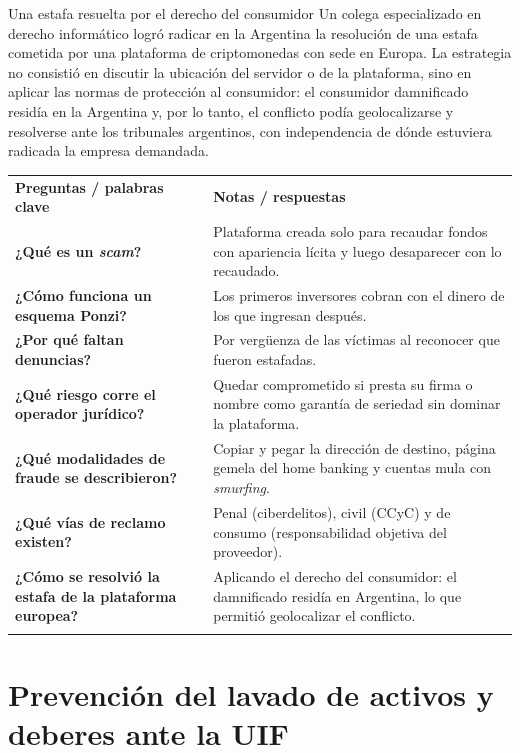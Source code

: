 \documentclass[12pt,oneside]{book}
\newcommand{\cq}[1]{\textbf{#1}}
\newcommand{\cornell}[3]{%
  \par\medskip\noindent\begingroup
  \renewcommand{\arraystretch}{1.25}%
  \begin{tabularx}{\textwidth}{|>{\raggedright\arraybackslash}p{0.27\textwidth}|>{\raggedright\arraybackslash}X|}
    \hline
    \multicolumn{2}{|>{\centering\arraybackslash}X|}{\cellcolor{azulacad!12}\textbf{Cuadro Cornell --- #1}}\\ \hline
    \cellcolor{gray!10}\textbf{Preguntas / palabras clave} & \cellcolor{gray!10}\textbf{Notas / respuestas} \\ \hline
    #2
    \multicolumn{2}{|>{\raggedright\arraybackslash}X|}{\cellcolor{azulacad!6}\textbf{Resumen.} #3}\\ \hline
  \end{tabularx}%
  \endgroup\par\medskip}
\begin{document}
\begin{example}{Una estafa resuelta por el derecho del consumidor}
Un colega especializado en derecho informático logró radicar en la Argentina la resolución de una estafa cometida por una plataforma de criptomonedas con sede en Europa. La estrategia no consistió en discutir la ubicación del servidor o de la plataforma, sino en aplicar las normas de protección al consumidor: el consumidor damnificado residía en la Argentina y, por lo tanto, el conflicto podía geolocalizarse y resolverse ante los tribunales argentinos, con independencia de dónde estuviera radicada la empresa demandada.
\end{example}

\cornell{Estafas, esquemas piramidales y responsabilidad}{
\cq{¿Qué es un \emph{scam}?} & Plataforma creada solo para recaudar fondos con apariencia lícita y luego desaparecer con lo recaudado. \\ \hline
\cq{¿Cómo funciona un esquema Ponzi?} & Los primeros inversores cobran con el dinero de los que ingresan después. \\ \hline
\cq{¿Por qué faltan denuncias?} & Por vergüenza de las víctimas al reconocer que fueron estafadas. \\ \hline
\cq{¿Qué riesgo corre el operador jurídico?} & Quedar comprometido si presta su firma o nombre como garantía de seriedad sin dominar la plataforma. \\ \hline
\cq{¿Qué modalidades de fraude se describieron?} & Copiar y pegar la dirección de destino, página gemela del home banking y cuentas mula con \emph{smurfing}. \\ \hline
\cq{¿Qué vías de reclamo existen?} & Penal (ciberdelitos), civil (CCyC) y de consumo (responsabilidad objetiva del proveedor). \\ \hline
\cq{¿Cómo se resolvió la estafa de la plataforma europea?} & Aplicando el derecho del consumidor: el damnificado residía en Argentina, lo que permitió geolocalizar el conflicto. \\ \hline
}{Las plataformas digitales facilitan estafas y esquemas piramidales; el operador jurídico debe verificar antes de recomendar y conoce las vías penal, civil y de consumo para reclamar, apoyadas en la trazabilidad de los activos.}

\chapter{Prevención del lavado de activos y deberes ante la UIF}
\label{cap:pbc}
\end{document}
